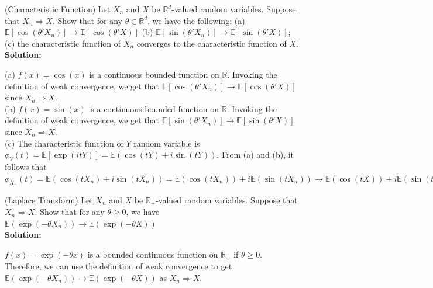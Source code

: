 \documentclass[11pt,letterpaper]{article}                  %
\begin{document}
\bigskip

\begin{problem} (Characteristic Function) Let $X_n$ and $X$ be $\mathbb{R}^d$-valued random variables. Suppose that $X_n \Rightarrow X$. Show that for any $\theta \in \mathbb{R}^d$, we have the following:
	(a) $\mathbb{E}\left[\cos(\theta' X_n)\right] \rightarrow \mathbb{E}[\cos(\theta' X)]$
	(b) $\mathbb{E}[\sin(\theta' X_n)] \rightarrow \mathbb{E}[\sin(\theta' X)]$;
	(c) the characteristic function of $X_n$ converges to the characteristic function of $X$. \\
	
\textbf{Solution:} 

(a) 	$f(x) = \cos(x)$ is a continuous bounded function on $\mathbb{R}$. Invoking the definition of weak convergence, we get that $\mathbb{E}\left[\cos(\theta' X_n)\right] \rightarrow \mathbb{E}[\cos(\theta' X)]$ since $X_n \Rightarrow X$. \\
	
(b) 	$f(x) = \sin(x)$ is a continuous bounded function on $\mathbb{R}$. Invoking the definition of weak convergence, we get that $\mathbb{E}[\sin(\theta' X_n)] \rightarrow \mathbb{E}[\sin(\theta' X)]$ since $X_n \Rightarrow X$. \\

(c) The characteristic function of $Y$ random variable is $\phi_{Y}(t) = \mathbb{E}\left[\exp(itY)\right] = \mathbb{E}(\cos(tY) + i \sin(tY))$. From (a) and (b), it follows that  $\phi_{X_n}(t) =  \mathbb{E}(\cos(tX_n) + i \sin(tX_n)) = \mathbb{E}(\cos(tX_n)) + i \mathbb{E}(\sin(tX_n)) \rightarrow \mathbb{E}(\cos(tX)) + i \mathbb{E}(\sin(tX)) = \phi_{X}(t).$

\end{problem}

\bigskip

\begin{problem}(Laplace Transform) Let $X_n$ and $X$ be $\mathbb{R}_{+}$-valued random variables. Suppose that $X_n \Rightarrow X$. Show that for any $\theta \geq 0$, we have $\mathbb{E}(\exp(-\theta X_n)) \rightarrow \mathbb{E}(\exp(-\theta X))$ \\
	
\textbf{Solution:} 

$f(x) = \exp(-\theta x)$ is a bounded continuous function on $\mathbb{R}_{+}$ if $\theta \geq 0$. Therefore, we can use the definition of weak convergence to get $\mathbb{E}(\exp(-\theta X_n)) \rightarrow \mathbb{E}(\exp(-\theta X))$ as   $X_n \Rightarrow X$.

\end{problem}
\end{document}
